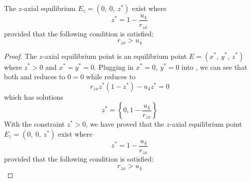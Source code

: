\begin{theorem}\label{thm:axial-z-exist}
    The $z$-axial equilibrium $E_z=\left(0,\ 0,\ z^*\right)$ exist where
    \begin{equation*}
        z^* = 1-\frac{u_4}{r_{zx}}
    \end{equation*}
    provided that the following condition is satisfied:
    \begin{equation*}
        r_{zx} > u_4
    \end{equation*}
\end{theorem}
\begin{proof}
    The $z$-axial equilibrium point is an equilibrium point $E=\left(x^*,\ y^*,\ z^*\right)$ where $z^*>0$ and $x^*=y^*=0$. Plugging in $x^*=0,\ y^*=0$ into , we can see that both  and  reduces to $0=0$ while  reduces to
    \begin{equation*}
        r_{zx}z^*\left(1-z^*\right)-u_4z^*=0
    \end{equation*}
    which has solutions
    \begin{equation*}
        z^*=\left\{0,1-\frac{u_4}{r_{zx}}\right\}
    \end{equation*}
    With the constraint $z^*>0$, we have proved that the $z$-axial equilibrium point $E_z=\left(0,\ 0,\ z^*\right)$ exist where
    \begin{equation*}
        z^* = 1-\frac{u_4}{r_{zx}}
    \end{equation*}
    provided that the following condition is satisfied:
    \begin{equation*}
        r_{zx} > u_4
    \end{equation*}
\end{proof}

